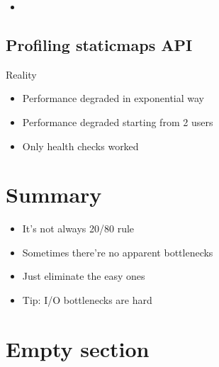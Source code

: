 \documentclass[16pt]{beamer}
\begin{document}
\begin{frame}{}
  \begin{itemize}
  \item
  \end{itemize}
\end{frame}

\subsection{Profiling staticmaps API}

\begin{frame}{Reality}
  \begin{itemize}
  \item Performance degraded in exponential way
  \item Performance degraded starting from 2 users
  \item Only health checks worked
  \end{itemize}
\end{frame}

\section*{Summary}

\begin{frame}{}
  \begin{itemize}
  \item It's not always 20/80 rule
  \item Sometimes there're no apparent bottlenecks
  \item Just eliminate the easy ones
  \item Tip: I/O bottlenecks are hard
  \end{itemize}
\end{frame}

\section{Empty section}
\end{document}
